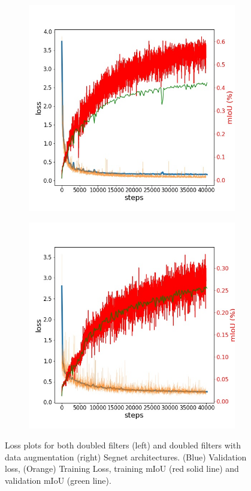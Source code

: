 \begin{figure}
\centering
\begin{subfigure}{.5\textwidth}
  \centering
  \includegraphics[width=.95\linewidth]{seg_res_1.jpg}
\end{subfigure}%
\begin{subfigure}{.5\textwidth}
  \centering
  \includegraphics[width=.95\linewidth]{seg_res_2.jpg}
\end{subfigure}
\caption{Loss plots for both doubled filters (left) and doubled filters with data augmentation (right) Segnet architectures. (Blue) Validation loss, (Orange) Training Loss,  training mIoU (red solid line) and validation mIoU (green line). }
\label{segnet:filters}
\end{figure}

